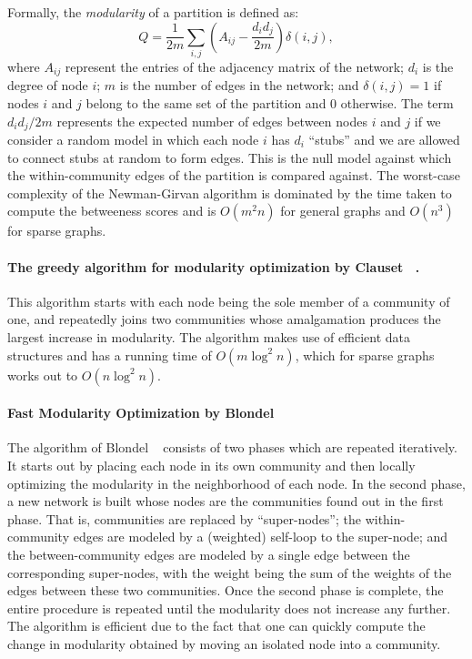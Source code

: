 Formally, the \emph{modularity} of a partition is defined as:
\begin{equation}\label{eqn:modularity}
	Q = \frac{1}{2m} \sum_{i, j} \left ( A_{i j} - \frac{d_i d_j}{2m} \right ) \delta(i, j),
\end{equation}
where $A_{ij}$ represent the entries of the adjacency matrix of the network; $d_i$ is the 
degree of node $i$; $m$ is the number of edges in the network; and $\delta(i, j) = 1$ if nodes
$i$ and $j$ belong to the same set of the partition and $0$ otherwise. The term $d_i d_j / 2m$ 
represents the expected number of edges between nodes $i$ and $j$ if we consider a random model
in which each node $i$ has $d_i$ ``stubs'' and we are allowed to connect stubs at random to form edges. 
This is the null model against which the within-community edges of the partition is compared against.
The worst-case complexity of the Newman-Girvan algorithm is dominated by the time taken 
to compute the betweeness scores and is $O(m^2 n)$ for general graphs and $O(n^3)$ for sparse graphs.

\paragraph{The greedy algorithm for modularity optimization by Clauset \etal~\cite{CNM04}.}
This algorithm starts with each node being the sole member of a community of one, and 
repeatedly joins two communities whose amalgamation produces the largest increase in modularity. 
The algorithm makes use of efficient data structures and has a running time of $O(m \log^2 n)$, 
which for sparse graphs works out to $O(n \log^2 n)$. 

\paragraph{Fast Modularity Optimization by Blondel \etal} 
The algorithm of Blondel \etal~\cite{BGLL08} consists of two phases which are repeated iteratively. 
It starts out by placing each node in its own community and then locally optimizing the modularity 
in the neighborhood of each node. In the second phase, a new network is built whose nodes are the 
communities found out in the first phase. That is, communities are replaced by ``super-nodes''; the 
within-community edges are modeled by a (weighted) self-loop to the super-node; and the between-community 
edges are modeled by a single edge between the corresponding super-nodes, with the weight being 
the sum of the weights of the edges between these two communities. 
Once the second phase is complete, the entire procedure is repeated until the modularity does not 
increase any further. The algorithm is efficient due to the fact that one can quickly compute the 
change in modularity obtained by moving an isolated node into a community.


